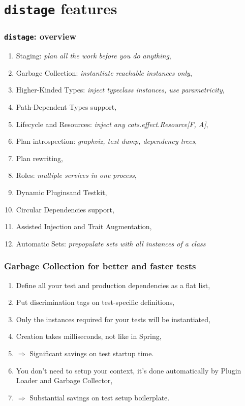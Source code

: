 \documentclass[usenames,dvipsnames]{beamer}
\newcommand{\distage}{\texttt{distage}\xspace}
\begin{document}
\section{\distage{} features}
\begin{frame}
  \frametitle{\distage: overview}
  \begin{enumerate}
    \item Staging: \textit{plan all the work before you do anything},
    \item Garbage Collection: \textit{instantiate reachable instances only},
    \item Higher-Kinded Types: \textit{inject typeclass instances, use parametricity},
    \item Path-Dependent Types support,
    \item Lifecycle and Resources: \textit{inject any cats.effect.Resource[F, A]},
    \item Plan introspection: \textit{graphviz, text dump, dependency trees},
    \item Plan rewriting,
    \item Roles: \textit{multiple services in one process},
    \item Dynamic Plugins\footnotemark[1] and Testkit,
    \item Circular Dependencies support,
    \item Assisted Injection and Trait Augmentation\footnotemark[2],
    \item Automatic Sets: \textit{prepopulate sets with all instances of a class}
  \end{enumerate}
\end{frame}

\begin{frame}
\frametitle{Garbage Collection for better and faster tests}
  \begin{enumerate}
    \item Define all your test and production dependencies as a flat list,
    \item Put discrimination tags on test-specific definitions,
    \item Only the instances required for your tests will be instantiated,
    \item Creation takes milliseconds, not like in Spring,
    \item $\Rightarrow$ Significant savings on test startup time.
    \item You don't need to setup your context, it's done automatically by Plugin Loader and Garbage Collector,
    \item $\Rightarrow$ Substantial savings on test setup boilerplate.
  \end{enumerate}
\end{frame}
\end{document}
